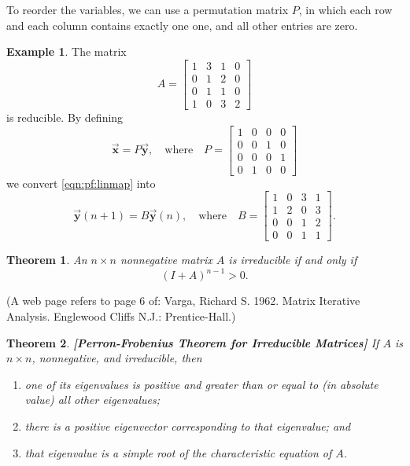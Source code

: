 \documentclass[reqno]{immbook}
\newcommand{\BX}{\vec{\textbf{x}}}
\newcommand{\BY}{\vec{\textbf{y}}}
\numberwithin{equation}{chapter}
\newtheorem{theorem}{Theorem}
\numberwithin{question}{section}
\numberwithin{theorem}{chapter}
\numberwithin{figure}{chapter}
\theoremstyle{definition}
\newtheorem{example}{Example}[section]
\begin{document}
To reorder the variables, we can use a permutation matrix
$P$, in which each row and each column contains exactly
one one, and all other entries are zero.
\begin{example}
The matrix 
\begin{equation}
  A = \begin{bmatrix}
            1 & 3 & 1 & 0 \\
            0 & 1 & 2 & 0 \\
            0 & 1 & 1 & 0 \\
            1 & 0 & 3 & 2
      \end{bmatrix}
\end{equation}
is reducible.  By defining
\begin{equation}
   \BX = P\BY, \quad \textrm{where}\quad
   P = \begin{bmatrix}
          1 & 0 & 0 & 0 \\
          0 & 0 & 1 & 0 \\
          0 & 0 & 0 & 1 \\
          0 & 1 & 0 & 0
       \end{bmatrix}
\end{equation}
we convert \eqref{eqn:pf:linmap} into
\begin{equation}
   \BY(n+1) = B\BY(n), \quad \textrm{where} \quad
   B = \begin{bmatrix}
         1 & 0 & 3 & 1 \\
         1 & 2 & 0 & 3 \\
         0 & 0 & 1 & 2 \\
         0 & 0 & 1 & 1
       \end{bmatrix}.
\end{equation}
\end{example}
\begin{theorem}
An $n\times n$ nonnegative matrix $A$ is 
irreducible if and only if
\begin{equation}
   (I+A)^{n-1} > 0.
\end{equation}
\end{theorem}
(A web page refers to page 6 of:
Varga, Richard S. 1962. Matrix Iterative Analysis. Englewood Cliffs N.J.: Prentice-Hall.)

\begin{theorem}
\textbf{[Perron-Frobenius Theorem for Irreducible Matrices]}
If $A$ is $n\times n$, nonnegative,
and irreducible, then
\begin{enumerate}
\item one of its eigenvalues is positive and greater
  than or equal to (in absolute value) all other
  eigenvalues;
\item there is a positive eigenvector corresponding to that eigenvalue;
  and
\item that eigenvalue is a simple root of the characteristic equation of $A$.
\end{enumerate}
\end{theorem}
\end{document}
